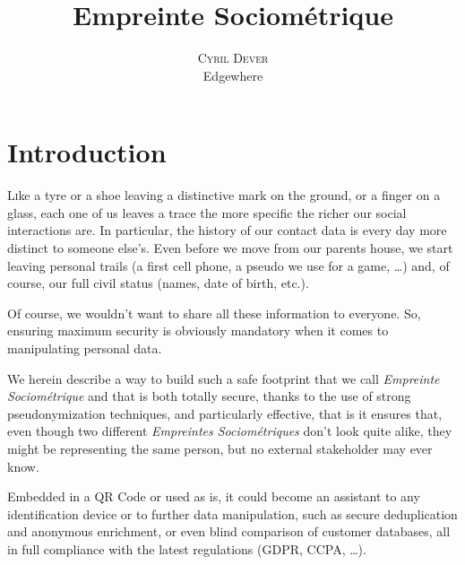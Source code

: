 \documentclass[twoside,twocolumn]{article}
\title{Empreinte Sociométrique} %
\author{%
    \textsc{Cyril Dever}\\ %
    \normalsize Edgewhere \\ %
}
\date{\DTMusedate{thedate}}
\renewcommand{\thefootnote}{\arabic{footnote}}
\theoremstyle{definition}
\theoremstyle{remark}
\begin{document}
\maketitle

{\renewcommand{\thefootnote}{\fnsymbol{footnote}} }


\section{Introduction}

\lettrine[nindent=0em,lines=3]{L}ike a tyre or a shoe leaving a distinctive mark on the ground, or a finger on a glass, each one of us leaves a trace 
the more specific the richer our social interactions are. In particular, the history of our contact data is every day more distinct to someone else's. 
Even before we move from our parents house, we start leaving personal trails (a first cell phone, a pseudo we use for a game, \dots) and, of course, our 
full civil status (names, date of birth, etc.).

Of course, we wouldn't want to share all these information to everyone. So, ensuring maximum security is obviously mandatory when it comes to manipulating 
personal data.

We herein describe a way to build such a safe footprint that we call \emph{Empreinte Sociométrique}\cite{empreinteSociometrique:cyd} and that is both 
totally secure, thanks to the use of strong pseudonymization techniques, and particularly effective, that is it ensures that, even though two different 
\emph{Empreintes Sociométriques} don't look quite alike, they might be representing the same person, but no external stakeholder may ever know.

Embedded in a QR Code or used as is, it could become an assistant to any identification device or to further data manipulation, such as secure 
deduplication and anonymous enrichment, or even blind comparison of customer databases, all in full compliance with the latest regulations (GDPR, CCPA, 
\dots).

\end{document}
